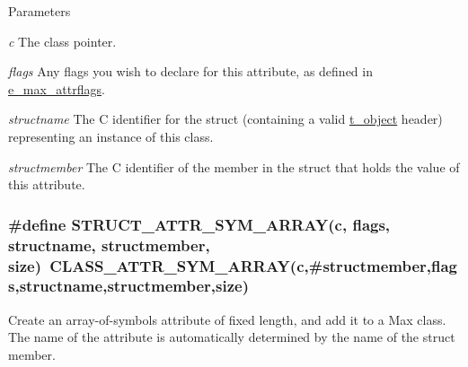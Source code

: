 \begin{DoxyParams}{Parameters}
\item[{\em c}]The class pointer. \item[{\em flags}]Any flags you wish to declare for this attribute, as defined in \hyperlink{group__attr_gaf296cfc6741bb19207f6ed8062809115}{e\_\-max\_\-attrflags}. \item[{\em structname}]The C identifier for the struct (containing a valid \hyperlink{structt__object}{t\_\-object} header) representing an instance of this class. \item[{\em structmember}]The C identifier of the member in the struct that holds the value of this attribute. \end{DoxyParams}
\hypertarget{group__attr_ga134802cf096a19aa911dff3c350de6ff}{
\subsubsection[{STRUCT\_\-ATTR\_\-SYM\_\-ARRAY}]{\setlength{\rightskip}{0pt plus 5cm}\#define STRUCT\_\-ATTR\_\-SYM\_\-ARRAY(c, \/  flags, \/  structname, \/  structmember, \/  size)~CLASS\_\-ATTR\_\-SYM\_\-ARRAY(c,\#structmember,flags,structname,structmember,size)}}
\label{group__attr_ga134802cf096a19aa911dff3c350de6ff}


Create an array-\/of-\/symbols attribute of fixed length, and add it to a Max class. The name of the attribute is automatically determined by the name of the struct member.


